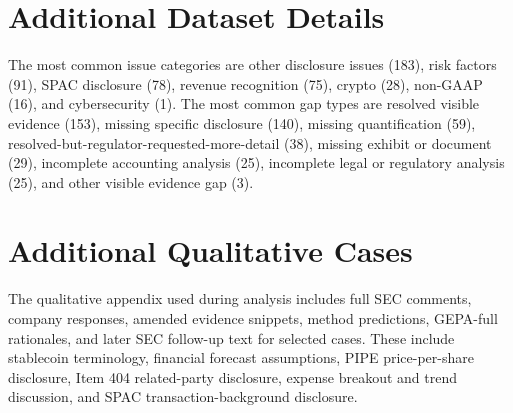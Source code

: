 \documentclass[11pt]{article}
\begin{document}
\section{Additional Dataset Details}
\label{app:data}

The most common issue categories are other disclosure issues (183), risk factors (91), SPAC disclosure (78), revenue recognition (75), crypto (28), non-GAAP (16), and cybersecurity (1). The most common gap types are resolved visible evidence (153), missing specific disclosure (140), missing quantification (59), resolved-but-regulator-requested-more-detail (38), missing exhibit or document (29), incomplete accounting analysis (25), incomplete legal or regulatory analysis (25), and other visible evidence gap (3).

\section{Additional Qualitative Cases}
\label{app:cases}

The qualitative appendix used during analysis includes full SEC comments, company responses, amended evidence snippets, method predictions, GEPA-full rationales, and later SEC follow-up text for selected cases. These include stablecoin terminology, financial forecast assumptions, PIPE price-per-share disclosure, Item 404 related-party disclosure, expense breakout and trend discussion, and SPAC transaction-background disclosure.
\end{document}
